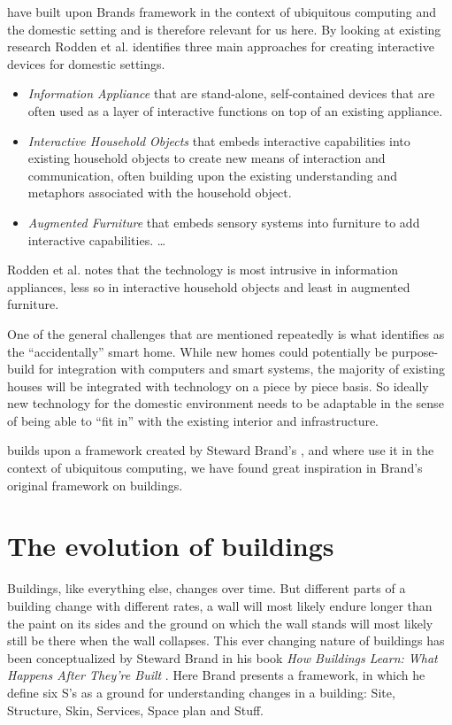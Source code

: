 
\citet{rodden2003evolution} have built upon Brands framework in the context of ubiquitous computing and the domestic setting and is therefore relevant for us here.
By looking at existing research Rodden et al. identifies three main approaches for creating interactive devices for domestic settings.

\begin{itemize}
  \item{\emph{Information Appliance} that are stand-alone, self-contained devices that are often used as a layer of interactive functions on top of an existing appliance.}
  \item{\emph{Interactive Household Objects} that embeds interactive capabilities into existing household objects to create new means of interaction and communication, often building upon the existing understanding and metaphors associated with the household object.}
  \item{\emph{Augmented Furniture} that embeds sensory systems into furniture to add interactive capabilities. \ldots}
\end{itemize}

Rodden et al. notes that the technology is most intrusive in information appliances, less so in interactive household objects and least in augmented furniture.


One of the general challenges that are mentioned repeatedly \citep{edwards2001home,aldrich2003smart,rodden2003evolution,brand1995buildings} is what \citet{edwards2001home} identifies as the ``accidentally'' smart home.
While new homes could potentially be purpose-build for integration with computers and smart systems, the majority of existing houses will be integrated with technology on a piece by piece basis.
So ideally new technology for the domestic environment needs to be adaptable in the sense of being able to ``fit in'' with the existing interior and infrastructure. 

\citet{rodden2003evolution} builds upon a framework created by Steward Brand's \citep{brand1995buildings}, and where \citeauthor{rodden2003evolution} use it in the context of ubiquitous computing, we have found great inspiration in Brand's original framework on buildings.

\section{The evolution of buildings}
Buildings, like everything else, changes over time.
But different parts of a building change with different rates, a wall will most likely endure longer than the paint on its sides and the ground on which the wall stands will most likely still be there when the wall collapses.
This ever changing nature of buildings has been conceptualized by Steward Brand in his book \emph{How Buildings Learn: What Happens After They're Built} \citep{brand1995buildings}.
Here Brand presents a framework, in which he define six S's as a ground for understanding changes in a building: Site, Structure, Skin, Services, Space plan and Stuff.

